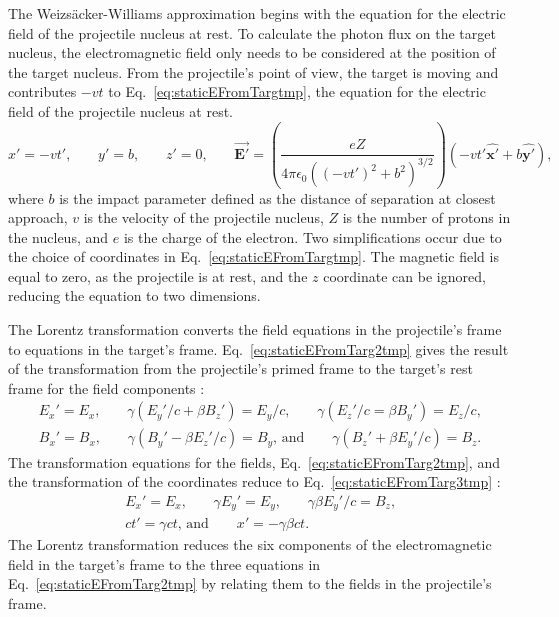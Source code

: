     The Weizs\"{a}cker-Williams approximation begins with the equation for the 
      electric field of the projectile nucleus at rest. 
    To calculate the photon flux on the target nucleus, the electromagnetic field 
      only needs to be considered at the position of the target nucleus. 
    From the projectile's point of view, the target is moving and contributes
     $-vt$ to Eq.~\ref{eq:staticEFromTargtmp}, the equation for the electric 
     field of the projectile nucleus at rest.
    \begin{equation} \label{eq:staticEFromTargtmp}
        x'=-vt'\textrm{,}\qquad
        y'=b\textrm{,}\qquad
        z'=0\textrm{,}\qquad
        \vec{\mathbf{E'}}=\left(\frac{eZ}
         {4 \pi \epsilon_{0}\left(\left(-vt'\right)^{2}+b^{2}\right)^{3/2}}\right)
         \left(-vt'{\mathbf{\hat{x'}}+b\mathbf{\hat{y'}}}\right)\textrm{,}
    \end{equation}        
      where $b$ is the impact parameter
      defined as the distance of separation at closest approach, $v$ is the velocity of the 
      projectile nucleus, $Z$ is the number of protons in the nucleus, and $e$ 
      is the charge of the electron.
    Two simplifications occur due to the choice of coordinates in 
      Eq.~\ref{eq:staticEFromTargtmp}.
    The magnetic field is equal to zero, as the projectile is at rest, and
      the $z$ coordinate can be ignored, reducing the equation to two dimensions. 

    The Lorentz transformation converts the field equations in the 
      projectile's frame to equations in the target's frame.
    Eq.~\ref{eq:staticEFromTarg2tmp} gives the result of the transformation 
      from the projectile's primed frame to the target's rest frame for 
      the field components \cite{WWJackson}:
    \begin{eqnarray} \label{eq:staticEFromTarg2tmp}
        E_{x}'=E_{x}\textrm{,}\qquad
        \gamma\left(E_{y}'/c+\beta B_{z}'\right)=E_{y}/c\textrm{,}\qquad
        \gamma\left(E_{z}'/c=\beta B_{y}'\right)=E_{z}/c\textrm{,} \nonumber \\
        B_{x}'=B_{x}\textrm{,}\qquad
        \gamma\left(B_{y}'-\beta E_{z}'/c\right)=B_{y}\textrm{, and}\qquad
        \gamma\left(B_{z}'+\beta E_{y}'/c\right)=B_{z}\textrm{.}
    \end{eqnarray}
    The transformation equations for the fields, 
      Eq.~\ref{eq:staticEFromTarg2tmp}, and the transformation of the 
      coordinates reduce to Eq.~\ref{eq:staticEFromTarg3tmp} \cite{WWJackson}:
    \begin{eqnarray} \label{eq:staticEFromTarg3tmp}
        E_{x}'=E_{x}\textrm{,}\qquad
        \gamma E_{y}'=E_{y}\textrm{,}\qquad
        \gamma \beta E_{y}'/c=B_{z}\textrm{,}\nonumber \\
        ct'=\gamma ct\textrm{, and}\qquad
        x'=-\gamma \beta c t\textrm{.}
    \end{eqnarray}
    The Lorentz transformation reduces the six components of the 
      electromagnetic field in the target's frame to the three equations in 
      Eq.~\ref{eq:staticEFromTarg2tmp} by relating them to the fields in the 
      projectile's frame. 
    
